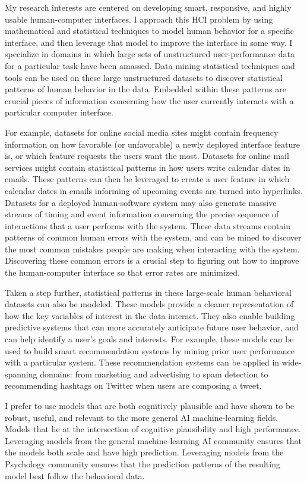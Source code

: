 My research interests are centered on developing smart, responsive, and highly usable human-computer interfaces.
I approach this HCI problem by using mathematical and statistical techniques to model human behavior for a specific interface, and then leverage that model to improve the interface in some way.
I specialize in domains in which large sets of unstructured user-performance data for a particular task have been amassed.
Data mining statistical techniques and tools can be used on these large unstructured datasets to discover statistical patterns of human behavior in the data.
Embedded within these patterns are crucial pieces of information concerning how the user currently interacts with a particular computer interface.

For example, datasets for online social media sites might contain frequency information on how favorable (or unfavorable) a newly deployed interface feature is,
or which feature requests the users want the most.
Datasets for online mail services might contain statistical patterns in how users write calendar dates in emails.
These patterns can then be leveraged to create a user feature in which calendar dates in emails informing of upcoming events are turned into hyperlinks.
Datasets for a deployed human-software system may also generate massive streams of timing and event information concerning the precise sequence of interactions that a user performs with the system.
These data streams contain patterns of common human errors with the system, and can be mined to discover the most common mistakes people are making when interacting with the system.
Discovering these common errors is a crucial step to figuring out how to improve the human-computer interface so that error rates are minimized.

Taken a step further, statistical patterns in these large-scale human behavioral datasets can also be modeled.
These models provide a cleaner representation of how the key variables of interest in the data interact.
They also enable building predictive systems that can more accurately anticipate future user behavior, and can help identify a user's goals and interests.
For example, these models can be used to build smart recommendation systems by mining prior user performance with a particular system.
These recommendation systems can be applied in wide-spanning domains: from marketing and advertising to spam detection to recommending hashtags on Twitter when users are composing a tweet.

I prefer to use models that are both cognitively plausible and have shown to be robust, useful, and relevant to the more general AI machine-learning fields.
Models that lie at the intersection of cognitive plausibility and high performance.
Leveraging models from the general machine-learning AI community ensures that the models both scale and have high prediction.
Leveraging models from the Psychology community ensures that the prediction patterns of the resulting model best follow the behavioral data.
